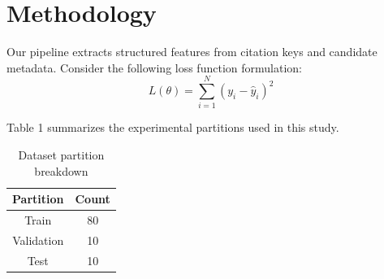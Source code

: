 \section{Methodology}
Our pipeline extracts structured features from citation keys and candidate metadata.
Consider the following loss function formulation:
\begin{equation}
L(\theta) = \sum_{i=1}^N (y_i - \hat{y}_i)^2
\label{eq:loss}
\end{equation}

Table 1 summarizes the experimental partitions used in this study.
\begin{table}[htpb]
\centering
\begin{tabular}{|c|c|}
\hline
Partition & Count \\
\hline
Train & 80 \\
Validation & 10 \\
Test & 10 \\
\hline
\end{tabular}
\caption{Dataset partition breakdown}
\end{table}
